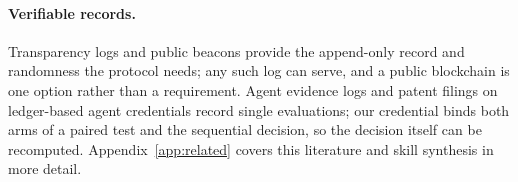 \paragraph{Verifiable records.} Transparency logs \citep{laurie2013ct,newman2022sigstore} and public beacons \citep{drand2026beacon} provide the append-only record and randomness the protocol needs; any such log can serve, and a public blockchain is one option rather than a requirement. Agent evidence logs \citep{bromme2026blackbox,seyedkazemi2026novafabric} and patent filings on ledger-based agent credentials \citep{drivehealth2026credentialing,dayama2022ibm} record single evaluations; our credential binds both arms of a paired test and the sequential decision, so the decision itself can be recomputed. Appendix~\ref{app:related} covers this literature and skill synthesis in more detail.

